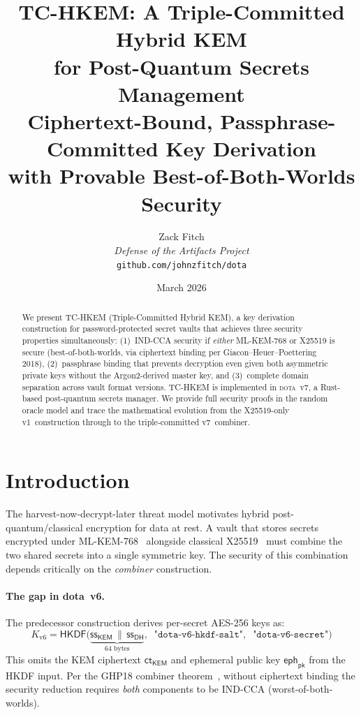 \documentclass[11pt,a4paper]{article}
\title{\textbf{TC-HKEM: A Triple-Committed Hybrid KEM \\
for Post-Quantum Secrets Management} \\[0.5em]
\large Ciphertext-Bound, Passphrase-Committed Key Derivation \\
with Provable Best-of-Both-Worlds Security}
\author{Zack Fitch \\
\textit{Defense of the Artifacts Project} \\
\texttt{github.com/johnzfitch/dota}}
\date{March 2026}
\newcommand{\KEM}{\mathsf{KEM}}
\renewcommand{\DH}{\mathsf{DH}}
\newcommand{\HKDF}{\mathsf{HKDF}}
\newcommand{\ct}{\mathsf{ct}}
\newcommand{\eph}{\mathsf{eph}}
\newcommand{\bytes}[1]{\texttt{#1}}
\begin{document}
\maketitle

\begin{abstract}
We present TC-HKEM (Triple-Committed Hybrid KEM), a key derivation
construction for password-protected secret vaults that achieves three
security properties simultaneously: (1)~IND-CCA security if
\emph{either} ML-KEM-768 or X25519 is secure (best-of-both-worlds,
via ciphertext binding per Giacon--Heuer--Poettering 2018), (2)~passphrase
binding that prevents decryption even given both asymmetric private keys
without the Argon2-derived master key, and (3)~complete domain separation
across vault format versions. TC-HKEM is implemented in \textsc{dota}~v7,
a Rust-based post-quantum secrets manager. We provide full security proofs
in the random oracle model and trace the mathematical evolution from
the X25519-only v1~construction through to the triple-committed v7~combiner.
\end{abstract}

\section{Introduction}\label{sec:intro}

The harvest-now-decrypt-later threat model motivates hybrid
post-quantum/classical encryption for data at rest. A vault that stores
secrets encrypted under ML-KEM-768~\cite{FIPS203} alongside classical
X25519~\cite{rfc7748} must combine the two shared secrets into a single
symmetric key. The security of this combination depends critically on the
\emph{combiner} construction.

\paragraph{The gap in dota~v6.}
The predecessor construction derives per-secret AES-256 keys as:
\begin{equation}\label{eq:v6}
K_{\mathrm{v6}} = \HKDF\bigl(\underbrace{\mathsf{ss}_{\KEM} \,\|\, \mathsf{ss}_{\DH}}_{64\text{ bytes}},\;\;\bytes{"dota-v6-hkdf-salt"},\;\;\bytes{"dota-v6-secret"}\bigr)
\end{equation}
This omits the KEM ciphertext $\ct_{\KEM}$ and ephemeral public key
$\eph_{\mathsf{pk}}$ from the HKDF input. Per the GHP18 combiner
theorem~\cite{GHP18}, without ciphertext binding the security
reduction requires \emph{both} components to be IND-CCA
(worst-of-both-worlds).
\end{document}
